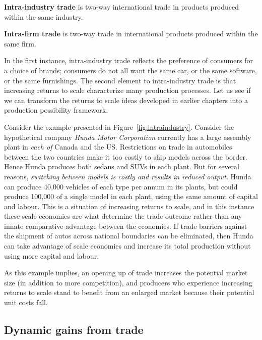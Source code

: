 \begin{DefBox}
	\textbf{Intra-industry trade} is two-way international trade in products produced within the same industry.
	
	\textbf{Intra-firm trade} is two-way trade in international products produced within the same firm.
\end{DefBox}

\newhtmlpage

In the first instance, intra-industry trade reflects the preference of
consumers for a choice of brands; consumers do not all want the same car, or
the same software, or the same furnishings. The second element to
intra-industry trade is that increasing returns to scale characterize many
production processes. Let us see if we can transform the returns to scale
ideas developed in earlier chapters into a production possibility framework.



\newhtmlpage

Consider the example presented in Figure~\ref{fig:intraindustry}. Consider the
hypothetical company \textit{Hunda Motor Corporation} currently 
has a large assembly plant in \textit{each of}
Canada and the US. Restrictions on trade in automobiles between the two
countries make it too costly to ship models across the border. Hence Hunda
produces both sedans and SUVs in each plant. But for several reasons, 
\textit{switching between models is costly and results in reduced output}.
Hunda can produce 40,000 vehicles of each type per annum in its plants, but
could produce 100,000 of a single model in each plant, using the same amount
of capital and labour. This is a situation of increasing returns to scale,
and in this instance these scale economies are what determine the trade
outcome rather than any innate comparative advantage between the economies.
If trade barriers against the shipment of autos across national boundaries
can be eliminated, then Hunda can take advantage of scale economies and
increase its total production without using more capital and labour. 

As this example implies, an opening up of trade increases the potential
market size (in addition to more competition), and producers who experience
increasing returns to scale stand to benefit from an enlarged market because
their potential unit costs fall.

\newhtmlpage

\subsection*{Dynamic gains from trade}

